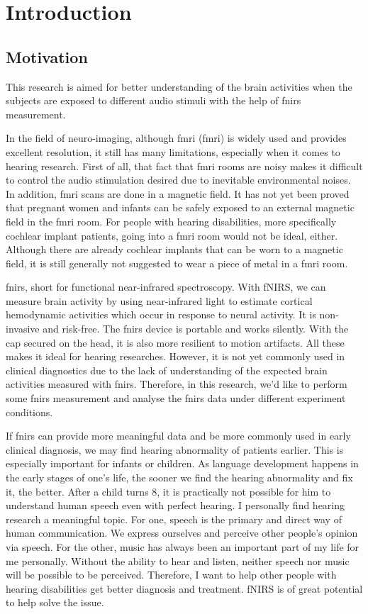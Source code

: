 \chapter{Introduction}

\section{Motivation}
This research is aimed for better understanding of the brain activities when the subjects are exposed to different audio stimuli with the help of \acrshort{fnirs} measurement.

In the field of neuro-imaging, although \acrlong{fmri}  (\acrshort{fmri})  is widely used and provides excellent resolution, it still has many limitations, especially when it comes to hearing research. First of all, that fact that \acrshort{fmri} rooms are noisy makes it difficult to control the audio stimulation desired due to inevitable environmental noises. In addition, \acrshort{fmri} scans are done in a magnetic field. It has not yet been proved that pregnant women and infants can be safely exposed to an external magnetic field in the \acrshort{fmri} room. For people with hearing disabilities, more specifically cochlear implant patients, going into a \acrshort{fmri} room would not be ideal, either. Although there are already cochlear implants that can be worn to a magnetic field, it is still generally not suggested to wear a piece of metal in a \acrshort{fmri} room.

\acrshort{fnirs},  short for functional near-infrared spectroscopy. With fNIRS, we can measure brain activity by using near-infrared light to estimate cortical hemodynamic activities which occur in response to neural activity. It is non-invasive and risk-free. The \acrshort{fnirs} device is portable and works silently. With the cap secured on the head, it is also more resilient to motion artifacts. All these makes it ideal for hearing researches. However, it is not yet commonly used in clinical diagnostics due to the lack of understanding of the expected brain activities measured with \acrshort{fnirs}. Therefore, in this research, we'd like to perform some \acrshort{fnirs} measurement and analyse the \acrshort{fnirs} data under different experiment conditions.

If \acrshort{fnirs} can provide more meaningful data and be more commonly used in early clinical diagnosis, we may find hearing abnormality of patients earlier. This is especially important for infants or children. As language development happens in the early stages of one's life, the sooner we find the hearing abnormality and fix it, the better. After a child turns 8, it is practically not possible for him to understand human speech even with perfect hearing. I personally find hearing research a meaningful topic. For one, speech is the primary and direct way of human communication. We express ourselves and perceive other people's opinion via speech. For the other, music has always been an important part of my life for me personally. Without the ability to hear and listen, neither speech nor music will be possible to be perceived. Therefore, I want to help other people with hearing disabilities get better diagnosis and treatment. fNIRS is of great potential to help solve the issue.

